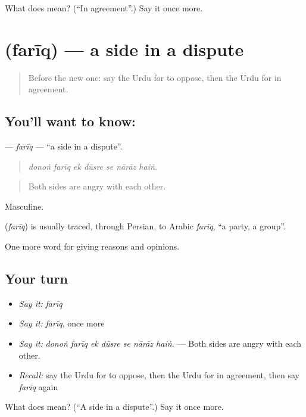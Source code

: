 \begin{tcolorbox}[breakable,colback=teal!4,colframe=teal!35!black,title={Before you move on}]
What does  mean? (\textquotedblleft{}In agreement\textquotedblright{}.) Say it once more.
\end{tcolorbox}
\section[\texorpdfstring{\ur{فریق} (farīq)}{فریق (farīq)}]{ (farīq) — a side in a dispute}

\label{lesson:UR-C335-fariq}



\begin{quote}
Before the new one: say the Urdu for to oppose, then the Urdu for in agreement.
\end{quote}

\subsection*{You'll want to know: }
\textbf{} — \emph{farīq} — \textquotedblleft{}a side in a dispute\textquotedblright{}.

\begin{quote}
      
\end{quote}

\begin{quote}
\emph{donoṅ farīq ek dūsre se nārāz haiṅ.}
\end{quote}

\begin{quote}
Both sides are angry with each other.
\end{quote}

Masculine.

\begin{cousinweb}
\textbf{} (\emph{farīq}) is usually traced, through Persian, to Arabic \emph{farīq}, \textquotedblleft{}a party, a group\textquotedblright{}.
\end{cousinweb}

\begin{grammarlens}[title={What you've built}]
One more word for giving reasons and opinions.
\end{grammarlens}

\subsection*{Your turn}
\begin{itemize}
\raggedright
  \item \emph{Say it:} \emph{farīq}
  \item \emph{Say it:} \emph{farīq}, once more
  \item \emph{Say it:} \emph{donoṅ farīq ek dūsre se nārāz haiṅ.} — Both sides are angry with each other.
  \item \emph{Recall:} say the Urdu for to oppose, then the Urdu for in agreement, then say \emph{farīq} again
\end{itemize}

\begin{tcolorbox}[breakable,colback=teal!4,colframe=teal!35!black,title={Before you move on}]
What does  mean? (\textquotedblleft{}A side in a dispute\textquotedblright{}.) Say it once more.
\end{tcolorbox}
